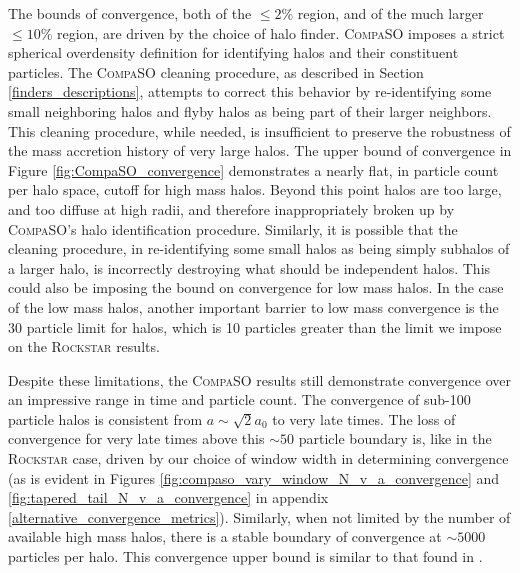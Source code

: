 The bounds of convergence, both of the $\leq2$\% region, and of the much larger $\leq10$\% region, are driven by the choice of halo finder. \textsc{CompaSO} imposes a strict spherical overdensity definition for identifying halos and their constituent particles. The \textsc{CompaSO} cleaning procedure, as described in Section \ref{finders_descriptions}, attempts to correct this behavior by re-identifying some small neighboring halos and flyby halos as being part of their larger neighbors. This cleaning procedure, while needed, is insufficient to preserve the robustness of the mass accretion history of very large halos. The upper bound of convergence in Figure \ref{fig:CompaSO_convergence} demonstrates a nearly flat, in particle count per halo space, cutoff for high mass halos. Beyond this point halos are too large, and too diffuse at high radii, and therefore inappropriately broken up by \textsc{CompaSO}'s halo identification procedure. Similarly, it is possible that the cleaning procedure, in re-identifying some small halos as being simply subhalos of a larger halo, is incorrectly destroying what should be independent halos. This could also be imposing the bound on convergence for low mass halos. In the case of the low mass halos, another important barrier to low mass convergence is the 30 particle limit for halos, which is 10 particles greater than the limit we impose on the \textsc{Rockstar} results.

Despite these limitations, the \textsc{CompaSO} results still demonstrate convergence over an impressive range in time and particle count. The convergence of sub-100 particle halos is consistent from $a\sim \sqrt{2}a_0$ to very late times. The loss of convergence for very late times above this $\sim 50$ particle boundary is, like in the \textsc{Rockstar} case, driven by our choice of window width in determining convergence (as is evident in Figures \ref{fig:compaso_vary_window_N_v_a_convergence} and \ref{fig:tapered_tail_N_v_a_convergence} in appendix \ref{alternative_convergence_metrics}). Similarly, when not limited by the number of available high mass halos, there is a stable boundary of convergence at $\sim5000$ particles per halo. This convergence upper bound is similar to that found in \cite{Maleubre_2024}.

